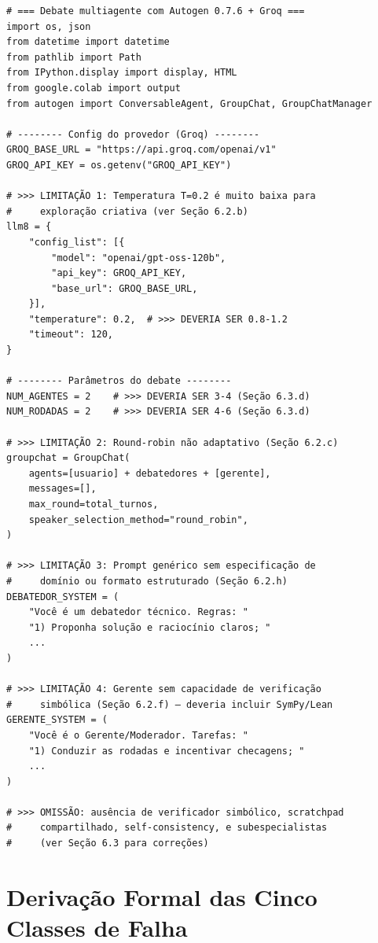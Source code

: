 \documentclass[5p]{elsarticle}
\theoremstyle{remark}
\begin{document}
\begin{verbatim}
# === Debate multiagente com Autogen 0.7.6 + Groq ===
import os, json
from datetime import datetime
from pathlib import Path
from IPython.display import display, HTML
from google.colab import output
from autogen import ConversableAgent, GroupChat, GroupChatManager

# -------- Config do provedor (Groq) --------
GROQ_BASE_URL = "https://api.groq.com/openai/v1"
GROQ_API_KEY = os.getenv("GROQ_API_KEY")

# >>> LIMITAÇÃO 1: Temperatura T=0.2 é muito baixa para
#     exploração criativa (ver Seção 6.2.b)
llm8 = {
    "config_list": [{
        "model": "openai/gpt-oss-120b",
        "api_key": GROQ_API_KEY,
        "base_url": GROQ_BASE_URL,
    }],
    "temperature": 0.2,  # >>> DEVERIA SER 0.8-1.2
    "timeout": 120,
}

# -------- Parâmetros do debate --------
NUM_AGENTES = 2    # >>> DEVERIA SER 3-4 (Seção 6.3.d)
NUM_RODADAS = 2    # >>> DEVERIA SER 4-6 (Seção 6.3.d)

# >>> LIMITAÇÃO 2: Round-robin não adaptativo (Seção 6.2.c)
groupchat = GroupChat(
    agents=[usuario] + debatedores + [gerente],
    messages=[],
    max_round=total_turnos,
    speaker_selection_method="round_robin",
)

# >>> LIMITAÇÃO 3: Prompt genérico sem especificação de
#     domínio ou formato estruturado (Seção 6.2.h)
DEBATEDOR_SYSTEM = (
    "Você é um debatedor técnico. Regras: "
    "1) Proponha solução e raciocínio claros; "
    ...
)

# >>> LIMITAÇÃO 4: Gerente sem capacidade de verificação
#     simbólica (Seção 6.2.f) — deveria incluir SymPy/Lean
GERENTE_SYSTEM = (
    "Você é o Gerente/Moderador. Tarefas: "
    "1) Conduzir as rodadas e incentivar checagens; "
    ...
)

# >>> OMISSÃO: ausência de verificador simbólico, scratchpad
#     compartilhado, self-consistency, e subespecialistas
#     (ver Seção 6.3 para correções)
\end{verbatim}

\section{Derivação Formal das Cinco Classes de Falha}
\end{document}
